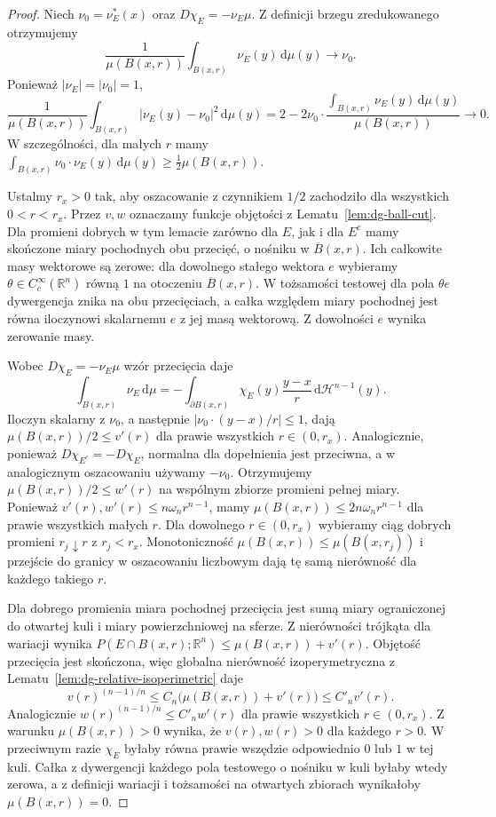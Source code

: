 \begin{proof}
Niech $\nu_0=\nu_E^*(x)$ oraz
$D\chi_E=-\nu_E\mu$. Z definicji brzegu
zredukowanego otrzymujemy
\[
 \frac{1}{\mu(B(x,r))}\int_{B(x,r)}\nu_E(y)
 \,\mathrm d\mu(y)\longrightarrow\nu_0.
\]
Ponieważ $|\nu_E|=|\nu_0|=1$,
\[
 \frac1{\mu(B(x,r))}\int_{B(x,r)}
 |\nu_E(y)-\nu_0|^2\,\mathrm d\mu(y)
 =2-2\nu_0\cdot\frac{\int_{B(x,r)}\nu_E(y)\,\mathrm d\mu(y)}
 {\mu(B(x,r))}\longrightarrow0.
\]
W szczególności, dla małych $r$ mamy
$\int_{B(x,r)}\nu_0\cdot\nu_E(y)\,\mathrm d\mu(y)
\ge\frac12\mu(B(x,r))$.

Ustalmy $r_x>0$ tak, aby oszacowanie z czynnikiem
$1/2$ zachodziło dla wszystkich $0<r<r_x$.
Przez $v,w$ oznaczamy funkcje objętości z
Lematu~\ref{lem:dg-ball-cut}.
Dla promieni dobrych w tym lemacie zarówno dla
$E$, jak i dla $E^c$ mamy skończone miary pochodnych
obu przecięć, o nośniku w $\overline B(x,r)$.
Ich całkowite masy wektorowe są zerowe:
dla dowolnego stałego wektora $e$ wybieramy
$\theta\in C_c^\infty(\mathbb R^n)$ równą $1$
na otoczeniu $\overline B(x,r)$.
W tożsamości testowej dla pola $\theta e$
dywergencja znika na obu przecięciach,
a całka względem miary pochodnej jest równa
iloczynowi skalarnemu $e$ z jej masą wektorową.
Z dowolności $e$ wynika zerowanie masy.

Wobec $D\chi_E=-\nu_E\mu$ wzór przecięcia daje
\[
 \int_{B(x,r)}\nu_E\,\mathrm d\mu
 =-\int_{\partial B(x,r)}\chi_E(y)\frac{y-x}{r}
 \,\mathrm d\mathcal H^{n-1}(y).
\]
Iloczyn skalarny z $\nu_0$, a następnie
$|\nu_0\cdot(y-x)/r|\le1$, dają
$\mu(B(x,r))/2\le v'(r)$ dla prawie wszystkich
$r\in(0,r_x)$. Analogicznie, ponieważ
$D\chi_{E^c}=-D\chi_E$, normalna dla dopełnienia
jest przeciwna, a w analogicznym oszacowaniu
używamy $-\nu_0$. Otrzymujemy
$\mu(B(x,r))/2\le w'(r)$ na wspólnym zbiorze
promieni pełnej miary.
Ponieważ $v'(r),w'(r)\le n\omega_n r^{n-1}$,
mamy $\mu(B(x,r))\le2n\omega_n r^{n-1}$
dla prawie wszystkich małych $r$.
Dla dowolnego $r\in(0,r_x)$ wybieramy ciąg
dobrych promieni $r_j\downarrow r$ z $r_j<r_x$.
Monotoniczność $\mu(B(x,r))\le\mu(B(x,r_j))$
i przejście do granicy w oszacowaniu liczbowym
dają tę samą nierówność dla każdego takiego $r$.

Dla dobrego promienia miara pochodnej przecięcia
jest sumą miary ograniczonej do otwartej kuli
i miary powierzchniowej na sferze. Z nierówności
trójkąta dla wariacji wynika
$P(E\cap B(x,r);\mathbb R^n)\le
\mu(B(x,r))+v'(r)$. Objętość przecięcia jest
skończona, więc globalna nierówność izoperymetryczna
z Lematu~\ref{lem:dg-relative-isoperimetric} daje
\[
 v(r)^{(n-1)/n}\le C_n
 \bigl(\mu(B(x,r))+v'(r)\bigr)
 \le C'_n v'(r).
\]
Analogicznie $w(r)^{(n-1)/n}\le C'_nw'(r)$
dla prawie wszystkich $r\in(0,r_x)$.
Z warunku $\mu(B(x,r))>0$ wynika, że
$v(r),w(r)>0$ dla każdego $r>0$.
W przeciwnym razie $\chi_E$ byłaby równa prawie
wszędzie odpowiednio $0$ lub $1$ w tej kuli.
Całka z dywergencji każdego pola testowego
o nośniku w kuli byłaby wtedy zerowa,
a z definicji wariacji i tożsamości na otwartych
zbiorach wynikałoby $\mu(B(x,r))=0$.


\end{proof}
